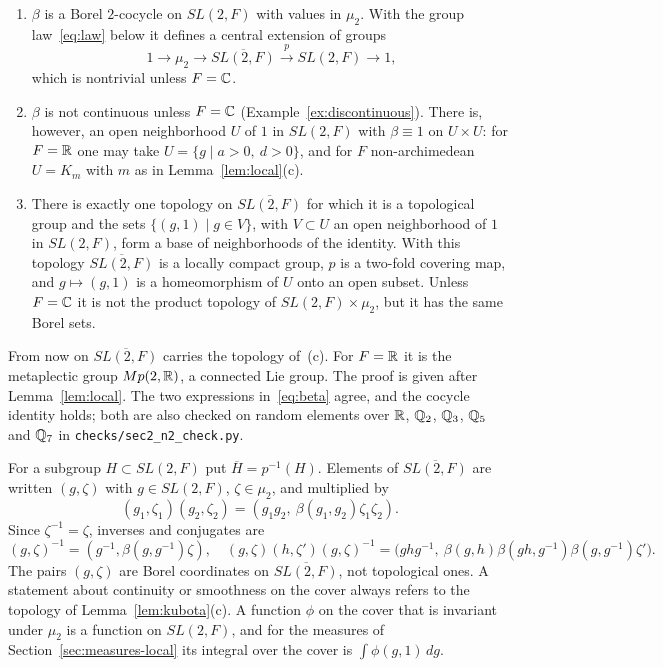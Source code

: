 \begin{lemma}\label{lem:kubota}
\begin{enumerate}[label=(\alph*)]
\item $\beta$ is a Borel $2$-cocycle on $SL(2,F)$ with values in
  $\mu_2$. With the group law~\eqref{eq:law} below it defines a central
  extension of groups
  \[
  1\to\mu_2\to\overline{SL(2,F)}\xrightarrow{\;p\;}SL(2,F)\to1,
  \]
  which is nontrivial unless $F=\mathbb{C}$.
\item $\beta$ is not continuous unless $F=\mathbb{C}$
  (Example~\ref{ex:discontinuous}). There is, however, an open
  neighborhood $U$ of $1$ in $SL(2,F)$ with $\beta\equiv1$ on $U\times U$:
  for $F=\mathbb{R}$ one may take $U=\{g\mid a>0,\ d>0\}$, and for $F$
  non-archimedean $U=K_m$ with $m$ as in Lemma~\ref{lem:local}(c).
\item There is exactly one topology on $\overline{SL(2,F)}$ for which it
  is a topological group and the sets $\{(g,1)\mid g\in V\}$, with
  $V\subset U$ an open neighborhood of $1$ in $SL(2,F)$, form a base of
  neighborhoods of the identity. With this topology
  $\overline{SL(2,F)}$ is a locally compact group, $p$ is a two-fold
  covering map, and $g\mapsto(g,1)$ is a homeomorphism of $U$ onto an open
  subset. Unless $F=\mathbb{C}$ it is not the product topology of
  $SL(2,F)\times\mu_2$, but it has the same Borel sets.
\end{enumerate}
\end{lemma}

From now on $\overline{SL(2,F)}$ carries the topology of~(c). For $F=\mathbb{R}$
it is the metaplectic group $Mp(2,\mathbb{R})$, a connected Lie group. The proof
is given after Lemma~\ref{lem:local}. The two expressions
in~\eqref{eq:beta} agree, and the cocycle identity holds; both are also
checked on random elements over $\mathbb{R}$, $\mathbb{Q}_2$, $\mathbb{Q}_3$, $\mathbb{Q}_5$ and $\mathbb{Q}_7$ in
\texttt{checks/sec2\_n2\_check.py}.

For a subgroup $H\subset SL(2,F)$ put $\overline H=p^{-1}(H)$. Elements
of $\overline{SL(2,F)}$ are written $(g,\zeta)$ with $g\in SL(2,F)$,
$\zeta\in\mu_2$, and multiplied by
\begin{equation}\label{eq:law}
(g_1,\zeta_1)(g_2,\zeta_2)=(g_1g_2,\ \beta(g_1,g_2)\zeta_1\zeta_2).
\end{equation}
Since $\zeta^{-1}=\zeta$, inverses and conjugates are
\begin{equation}\label{eq:inverse}
(g,\zeta)^{-1}=(g^{-1},\beta(g,g^{-1})\zeta),\quad
(g,\zeta)(h,\zeta')(g,\zeta)^{-1}
=\bigl(ghg^{-1},\ \beta(g,h)\beta(gh,g^{-1})\beta(g,g^{-1})\zeta'\bigr).
\end{equation}
The pairs $(g,\zeta)$ are Borel coordinates on $\overline{SL(2,F)}$, not
topological ones. A statement about continuity or smoothness on the
cover always refers to the topology of Lemma~\ref{lem:kubota}(c). A
function $\phi$ on the cover that is invariant under $\mu_2$ is a
function on $SL(2,F)$, and for the measures of
Section~\ref{sec:measures-local} its integral over the cover is
$\int\phi(g,1)\,dg$.

